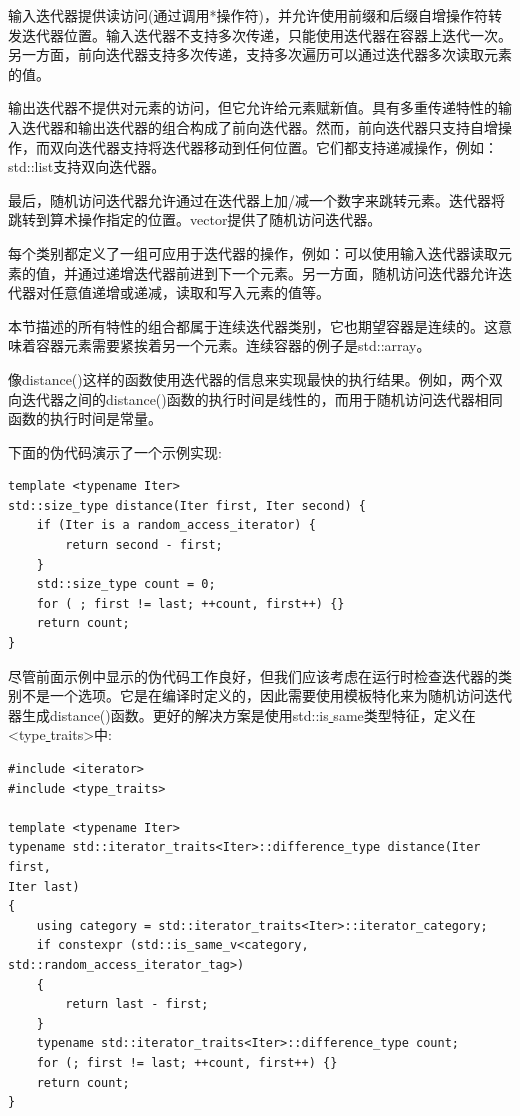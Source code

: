 输入迭代器提供读访问(通过调用*操作符)，并允许使用前缀和后缀自增操作符转发迭代器位置。输入迭代器不支持多次传递，只能使用迭代器在容器上迭代一次。另一方面，前向迭代器支持多次传递，支持多次遍历可以通过迭代器多次读取元素的值。 \par
输出迭代器不提供对元素的访问，但它允许给元素赋新值。具有多重传递特性的输入迭代器和输出迭代器的组合构成了前向迭代器。然而，前向迭代器只支持自增操作，而双向迭代器支持将迭代器移动到任何位置。它们都支持递减操作，例如：std::list支持双向迭代器。 \par
最后，随机访问迭代器允许通过在迭代器上加/减一个数字来跳转元素。迭代器将跳转到算术操作指定的位置。vector提供了随机访问迭代器。 \par
每个类别都定义了一组可应用于迭代器的操作，例如：可以使用输入迭代器读取元素的值，并通过递增迭代器前进到下一个元素。另一方面，随机访问迭代器允许迭代器对任意值递增或递减，读取和写入元素的值等。 \par
本节描述的所有特性的组合都属于连续迭代器类别，它也期望容器是连续的。这意味着容器元素需要紧挨着另一个元素。连续容器的例子是std::array。 \par
像distance()这样的函数使用迭代器的信息来实现最快的执行结果。例如，两个双向迭代器之间的distance()函数的执行时间是线性的，而用于随机访问迭代器相同函数的执行时间是常量。 \par
下面的伪代码演示了一个示例实现: \par

\begin{lstlisting}[caption={}]
template <typename Iter>
std::size_type distance(Iter first, Iter second) {
	if (Iter is a random_access_iterator) {
		return second - first;
	}
	std::size_type count = 0;
	for ( ; first != last; ++count, first++) {}
	return count;
}
\end{lstlisting}

尽管前面示例中显示的伪代码工作良好，但我们应该考虑在运行时检查迭代器的类别不是一个选项。它是在编译时定义的，因此需要使用模板特化来为随机访问迭代器生成distance()函数。更好的解决方案是使用std::is\underline{ }same类型特征，定义在<type\underline{ }traits>中: \par

\begin{lstlisting}[caption={}]
#include <iterator>
#include <type_traits>

template <typename Iter>
typename std::iterator_traits<Iter>::difference_type distance(Iter first,
Iter last)
{
	using category = std::iterator_traits<Iter>::iterator_category;
	if constexpr (std::is_same_v<category, std::random_access_iterator_tag>)
	{
		return last - first;
	}
	typename std::iterator_traits<Iter>::difference_type count;
	for (; first != last; ++count, first++) {}
	return count;
}
\end{lstlisting}

